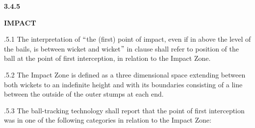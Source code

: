 \documentclass[12pt]{article}
\begin{document}
\vspace{\baselineskip}
{\fontsize{9pt}{10.8pt}\selectfont \textbf{3.4.5 \tabto{0.49in} }{\fontsize{8pt}{9.6pt}\selectfont \textbf{IMPACT}\par}\par}\par


\vspace{\baselineskip}
\begin{adjustwidth}{1.18in}{0.12in}
{\fontsize{9pt}{10.8pt}.5.1 \tabto{1.17in} The interpretation of $``$the (first) point of impact, even if in above the level of the bails, is between wicket and wicket$"$  in clause shall refer to position of the ball at the point of first interception, in relation to the Impact Zone.\par}\par

\end{adjustwidth}


\vspace{\baselineskip}
\begin{adjustwidth}{1.18in}{0.11in}
{\fontsize{9pt}{10.8pt}.5.2 \tabto{1.17in} The Impact Zone is defined as a three dimensional space extending between both wickets to an indefinite height and with its boundaries consisting of a line between the outside of the outer stumps at each end.\par}\par

\end{adjustwidth}


\vspace{\baselineskip}
\begin{adjustwidth}{1.18in}{0.39in}
{\fontsize{9pt}{10.8pt}.5.3 \tabto{1.17in} The ball-tracking technology shall report that the point of first interception was in one of the following categories in relation to the Impact Zone:\par}\par

\end{adjustwidth}


\vspace{\baselineskip}


\end{document}

